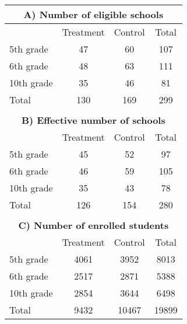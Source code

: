 \begin{adjustbox}{max width=\textwidth}
\begin{tabular}{lccc} \hline \hline
\multicolumn{4}{c}{\textbf{A) Number of eligible schools}}      \\ \hline
                       & Treatment     &   Control     & Total \\ 
\cmidrule(lr){2-4}
5th  grade &47&60&107 \\ 
6th  grade &48&63&111 \\ 
10th grade &35&46&81 \\ 
\cmidrule(lr){2-4}
Total      &130&169&299 \\ 
\hline \\ \hline
\multicolumn{4}{c}{\textbf{B) Effective number of schools}} \\ \hline
                       & Treatment     &   Control             & Total \\ 
\cmidrule(lr){2-4}
5th  grade &45&52&97 \\ 
6th  grade &46&59&105 \\ 
10th grade &35&43&78 \\ 
\cmidrule(lr){2-4}
Total     &126&154&280 \\ 
\hline \\ \hline
\multicolumn{4}{c}{\textbf{C) Number of enrolled students}} \\ \hline
                       &  Treatment    &   Control     & Total              \\ 
\cmidrule(lr){2-4}
5th  grade &4061&3952&8013 \\ 
6th  grade &2517&2871&5388 \\ 
10th grade &2854&3644&6498 \\ 
\cmidrule(lr){2-4}
Total      &9432&10467&19899 \\ 
\hline \hline \end{tabular}
\end{adjustbox}
